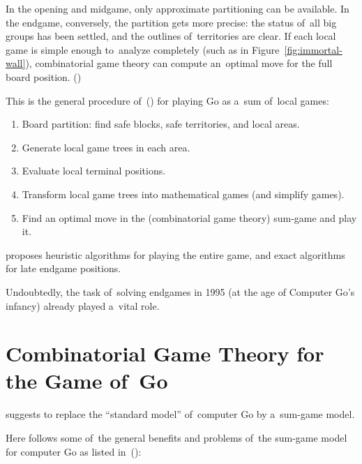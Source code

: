 In the opening and midgame, only approximate partitioning can be available.
In the endgame, conversely, the partition gets more precise:
the status of~all big groups has been settled, and the outlines of~territories are clear.
If each local game is simple enough to~analyze completely (such as in Figure~\ref{fig:immortal-wall}), combinatorial game theory can compute an~optimal move for the full board position.
(\cite{Muller1995computer})

This is the general procedure of~(\cite{Muller1995computer}) for playing Go as a~sum of~local games:
\begin{enumerate}
  \item Board partition: find safe blocks, safe territories, and local areas.
  \item Generate local game trees in each area.
  \item Evaluate local terminal positions.
  \item Transform local game trees into mathematical games (and simplify games).
  \item Find an optimal move in the (combinatorial game theory) sum-game and play it.
\end{enumerate}
\Mueller{} proposes heuristic algorithms for playing the entire game, and exact algorithms for late endgame positions.

Undoubtedly, the task of~solving endgames in 1995 (at the age of Computer Go's infancy) already played a~vital role.

\section{Combinatorial Game Theory for the Game of~Go}
\Mueller{} suggests to replace the ``standard model'' of~computer Go by a~sum-game model.

Here follows some of~the general benefits and problems of~the sum-game model for computer Go as listed in~(\cite{Muller1995computer}):

\medskip

